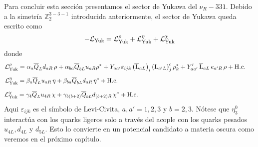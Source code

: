 Para concluir esta sección presentamos el sector de Yukawa del $\nu_R-331$. Debido a la simetría $\mathbb{Z}_2^{3-3-1}$ introducida anteriormente, el sector de Yukawa queda escrito como
\begin{equation}
-\mathcal{L}_{\rm Yuk} = \mathcal{L}^{\rho}_{\rm Yuk} + \mathcal{L}^{\eta}_{\rm Yuk} + \mathcal{L}^{\chi}_{\rm Yuk} 
\end{equation}
donde
\[
\mathcal{L}^{\rho}_{\rm Yuk} = \alpha_a \overline{Q}_L d_{aR} \, \rho + \alpha_{ba} \overline{Q}_{bL} u_{aR}\rho^{*} + Y_{aa'}\varepsilon_{ijk} \left( \overline{\text{L}}_{aL} \right)_i \left( \text{L}_{a'L} \right)_j^c \rho_k^* + Y_{aa'}' \, \overline{\text{L}}_{aL} \, e_{a'R}\, \rho + \text{H.c.} \hspace{0.2in}
\]
\begin{equation}
\mathcal{L}^{\eta}_{\rm Yuk} = \beta_a \overline{Q}_L u_{aR}\, \eta + \beta_{ba} \overline{Q}_{bL} d_{aR}\, \eta^* + \text{H.c.} \hspace{3.08in}
\end{equation}
\[
\mathcal{L}^{\chi}_{\rm Yuk} = \gamma_4 \overline{Q}_L u_{4R}\, \chi + \gamma_{b(b+2)} \overline{Q}_{bL} d_{(b+2)R}\, \chi^* + \text{H.c.} \hspace{2.6in}
\]
Aqui $\varepsilon_{ijk}$ es el símbolo de Levi-Civita, $a,a'=1,2,3$ y $b=2,3$. Nótese que $\eta_3^0$ interactúa con los quarks ligeros solo a través del acople con los quarks pesados $u_{4L}, d_{4L}$ y $d_{5L}$. Esto lo convierte en un potencial candidato a materia oscura como veremos en el próximo capítulo.


